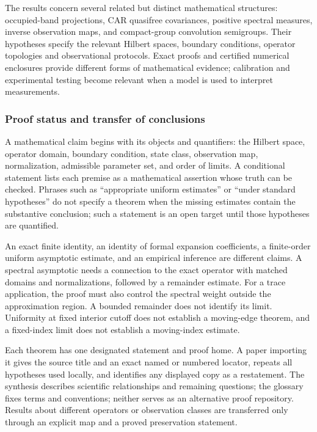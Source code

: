 \documentclass[
  10pt,
  a4paper,
]{article}
\begin{document}
The results concern several related but distinct mathematical structures: occupied-band projections, CAR quasifree covariances, positive spectral measures, inverse observation maps, and compact-group convolution semigroups. Their hypotheses specify the relevant Hilbert spaces, boundary conditions, operator topologies and observational protocols. Exact proofs and certified numerical enclosures provide different forms of mathematical evidence; calibration and experimental testing become relevant when a model is used to interpret measurements.

\subsubsection{Proof status and transfer of conclusions}\label{proof-status-and-transfer-of-conclusions}

A mathematical claim begins with its objects and quantifiers: the Hilbert space, operator domain, boundary condition, state class, observation map, normalization, admissible parameter set, and order of limits. A conditional statement lists each premise as a mathematical assertion whose truth can be checked. Phrases such as ``appropriate uniform estimates'' or ``under standard hypotheses'' do not specify a theorem when the missing estimates contain the substantive conclusion; such a statement is an open target until those hypotheses are quantified.

An exact finite identity, an identity of formal expansion coefficients, a finite-order uniform asymptotic estimate, and an empirical inference are different claims. A spectral asymptotic needs a connection to the exact operator with matched domains and normalizations, followed by a remainder estimate. For a trace application, the proof must also control the spectral weight outside the approximation region. A bounded remainder does not identify its limit. Uniformity at fixed interior cutoff does not establish a moving-edge theorem, and a fixed-index limit does not establish a moving-index estimate.

Each theorem has one designated statement and proof home. A paper importing it gives the source title and an exact named or numbered locator, repeats all hypotheses used locally, and identifies any displayed copy as a restatement. The synthesis describes scientific relationships and remaining questions; the glossary fixes terms and conventions; neither serves as an alternative proof repository. Results about different operators or observation classes are transferred only through an explicit map and a proved preservation statement.
\end{document}
